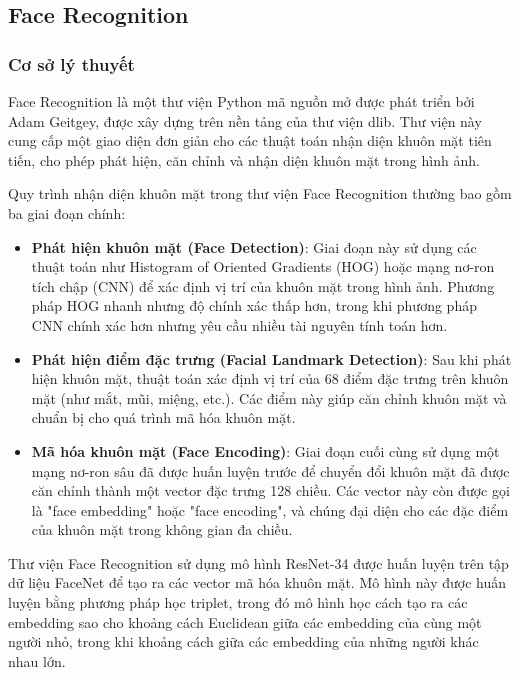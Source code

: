 \subsection{Face Recognition}

\subsubsection{Cơ sở lý thuyết}

Face Recognition\cite{facerecognition} là một thư viện Python mã nguồn mở được phát triển bởi Adam Geitgey, được xây dựng trên nền tảng của thư viện dlib\cite{dlib}. Thư viện này cung cấp một giao diện đơn giản cho các thuật toán nhận diện khuôn mặt tiên tiến, cho phép phát hiện, căn chỉnh và nhận diện khuôn mặt trong hình ảnh.

Quy trình nhận diện khuôn mặt trong thư viện Face Recognition thường bao gồm ba giai đoạn chính:

\begin{itemize}
    \item \textbf{Phát hiện khuôn mặt (Face Detection)}: Giai đoạn này sử dụng các thuật toán như Histogram of Oriented Gradients (HOG) hoặc mạng nơ-ron tích chập (CNN) để xác định vị trí của khuôn mặt trong hình ảnh. Phương pháp HOG nhanh nhưng độ chính xác thấp hơn, trong khi phương pháp CNN chính xác hơn nhưng yêu cầu nhiều tài nguyên tính toán hơn.
    
    \item \textbf{Phát hiện điểm đặc trưng (Facial Landmark Detection)}: Sau khi phát hiện khuôn mặt, thuật toán xác định vị trí của 68 điểm đặc trưng trên khuôn mặt (như mắt, mũi, miệng, etc.). Các điểm này giúp căn chỉnh khuôn mặt và chuẩn bị cho quá trình mã hóa khuôn mặt.
    
    \item \textbf{Mã hóa khuôn mặt (Face Encoding)}: Giai đoạn cuối cùng sử dụng một mạng nơ-ron sâu đã được huấn luyện trước để chuyển đổi khuôn mặt đã được căn chỉnh thành một vector đặc trưng 128 chiều. Các vector này còn được gọi là "face embedding" hoặc "face encoding", và chúng đại diện cho các đặc điểm của khuôn mặt trong không gian đa chiều.
\end{itemize}

Thư viện Face Recognition sử dụng mô hình ResNet-34 được huấn luyện trên tập dữ liệu FaceNet để tạo ra các vector mã hóa khuôn mặt. Mô hình này được huấn luyện bằng phương pháp học triplet, trong đó mô hình học cách tạo ra các embedding sao cho khoảng cách Euclidean giữa các embedding của cùng một người nhỏ, trong khi khoảng cách giữa các embedding của những người khác nhau lớn.

